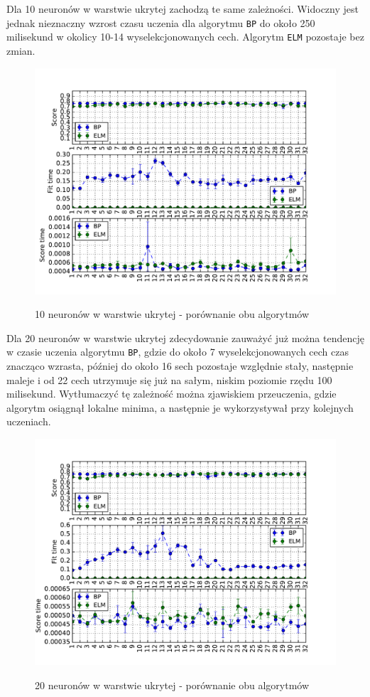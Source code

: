 \newpage

Dla 10 neuronów w warstwie ukrytej zachodzą te same zależności. Widoczny jest jednak nieznaczny wzrost czasu uczenia dla algorytmu \texttt{BP} do około 250 milisekund w okolicy 10-14 wyselekcjonowanych cech. Algorytm \texttt{ELM} pozostaje bez zmian.

\begin{figure}[h!]
	\centering
	\includegraphics[width=1.0\linewidth]{img/bp_elm_10.pdf}
	\label{Rysunek}
	\caption{10 neuronów w warstwie ukrytej - porównanie obu algorytmów}
\end{figure}

\newpage

Dla 20 neuronów w warstwie ukrytej zdecydowanie zauważyć już można tendencję w czasie uczenia algorytmu \texttt{BP}, gdzie do około 7 wyselekcjonowanych cech czas znacząco wzrasta, później do około 16 sech pozostaje względnie stały, następnie maleje i od 22 cech utrzymuje się już na sałym, niskim poziomie rzędu 100 milisekund. Wytłumaczyć tę zależność można zjawiskiem przeuczenia, gdzie algorytm osiągnął lokalne minima, a następnie je wykorzystywał przy kolejnych uczeniach.

\begin{figure}[h!]
	\centering
	\includegraphics[width=1.0\linewidth]{img/bp_elm_20.pdf}
	\label{Rysunek}
	\caption{20 neuronów w warstwie ukrytej - porównanie obu algorytmów}
\end{figure}

